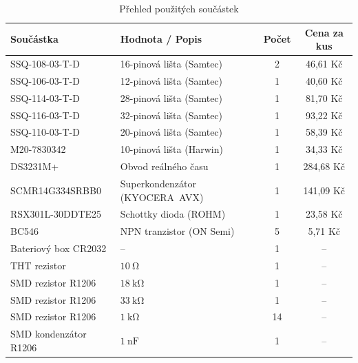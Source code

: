 \begin{table}[htbp]
    \centering
    \caption{Přehled použitých součástek}
    \label{tab:bom}
    \begin{tabularx}{\textwidth}{|X|X|c|c|}
        \hline
        \textbf{Součástka} & \textbf{Hodnota / Popis} & \textbf{Počet} & \textbf{Cena za kus} \\
        \hline
        SSQ-108-03-T-D      & 16-pinová lišta (Samtec)       & 2  & 46,61 Kč   \\ \hline
        SSQ-106-03-T-D      & 12-pinová lišta (Samtec)       & 1  & 40,60 Kč   \\ \hline
        SSQ-114-03-T-D      & 28-pinová lišta (Samtec)       & 1  & 81,70 Kč   \\ \hline
        SSQ-116-03-T-D      & 32-pinová lišta (Samtec)       & 1  & 93,22 Kč   \\ \hline
        SSQ-110-03-T-D      & 20-pinová lišta (Samtec)       & 1  & 58,39 Kč   \\ \hline
        M20-7830342         & 10-pinová lišta (Harwin)       & 1  & 34,33 Kč   \\ \hline
        DS3231M+            & Obvod reálného času             & 1  & 284,68 Kč  \\ \hline
        SCMR14G334SRBB0     & Superkondenzátor (\mbox{KYOCERA AVX})  & 1  & 141,09 Kč  \\ \hline
        RSX301L-30DDTE25    & Schottky dioda (ROHM)           & 1  & 23,58 Kč   \\ \hline
        BC546               & NPN tranzistor (ON Semi)        & 5  & 5,71 Kč    \\ \hline
        Bateriový box CR2032 & --                             & 1  & --         \\ \hline
        THT rezistor        & $\SI{10}{\ohm}$                 & 1  & --         \\ \hline
        SMD rezistor R1206  & $\SI{18}{\kilo\ohm}$            & 1  & --         \\ \hline
        SMD rezistor R1206  & $\SI{33}{\kilo\ohm}$            & 1  & --         \\ \hline
        SMD rezistor R1206  & $\SI{1}{\kilo\ohm}$             & 14 & --         \\ \hline
        SMD kondenzátor R1206  & $\SI{1}{\nano\farad}$        & 1  & --         \\ \hline
    \end{tabularx}
\end{table}

